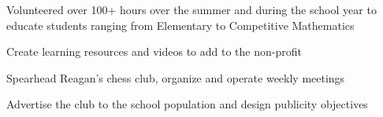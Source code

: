 \documentclass[letterpaper]{kathy-resume} %
\begin{document}
\begin{minipage}[t]{0.64\textwidth}

\begin{tightitemize}
\item Volunteered over 100+ hours over the summer and during the school year to educate students ranging from Elementary to Competitive Mathematics 
\item Create learning resources and videos to add to the non-profit
\end{tightitemize}

\sectionspace %



\begin{tightitemize}
\item Spearhead Reagan's chess club, organize and operate weekly meetings
\item Advertise the club to the school population and design publicity objectives
\end{tightitemize}


\end{minipage} %








\end{document}
